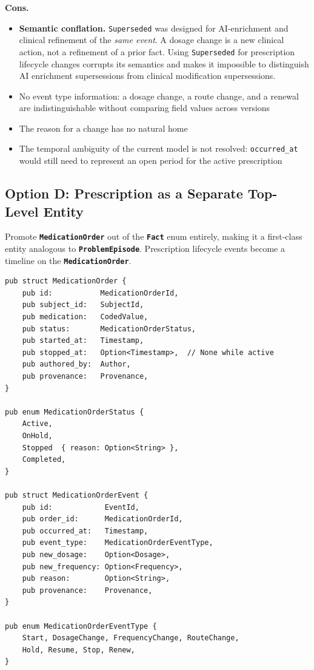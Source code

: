 \documentclass[11pt]{article}
\newcommand{\entity}[1]{\texttt{\textbf{#1}}}
\newcommand{\field}[1]{\texttt{#1}}
\newenvironment{consbox}{%
  \begin{mdframed}[backgroundcolor=warningyellow,
    linecolor=warningborder, linewidth=1pt,
    innertopmargin=8pt, innerbottommargin=8pt,
    innerleftmargin=10pt, innerrightmargin=10pt]
  \small
}{%
  \end{mdframed}
}
\begin{document}
\begin{consbox}
\textbf{Cons.}
\begin{itemize}[noitemsep]
  \item \textbf{Semantic conflation.} \field{Superseded} was designed
    for AI-enrichment and clinical refinement of the \emph{same event}.
    A dosage change is a new clinical action, not a refinement of
    a prior fact. Using \field{Superseded} for prescription lifecycle
    changes corrupts its semantics and makes it impossible to
    distinguish AI enrichment supersessions from clinical modification
    supersessions.
  \item No event type information: a dosage change, a route change,
    and a renewal are indistinguishable without comparing field values
    across versions
  \item The reason for a change has no natural home
  \item The temporal ambiguity of the current model is not resolved:
    \field{occurred\_at} would still need to represent an open period
    for the active prescription
\end{itemize}
\end{consbox}

\subsection{Option D: Prescription as a Separate Top-Level Entity}
\label{sec:option-d}

Promote \entity{MedicationOrder} out of the \entity{Fact} enum
entirely, making it a first-class entity analogous to
\entity{ProblemEpisode}. Prescription lifecycle events become a
timeline on the \entity{MedicationOrder}.

\begin{lstlisting}
pub struct MedicationOrder {
    pub id:           MedicationOrderId,
    pub subject_id:   SubjectId,
    pub medication:   CodedValue,
    pub status:       MedicationOrderStatus,
    pub started_at:   Timestamp,
    pub stopped_at:   Option<Timestamp>,  // None while active
    pub authored_by:  Author,
    pub provenance:   Provenance,
}

pub enum MedicationOrderStatus {
    Active,
    OnHold,
    Stopped  { reason: Option<String> },
    Completed,
}

pub struct MedicationOrderEvent {
    pub id:            EventId,
    pub order_id:      MedicationOrderId,
    pub occurred_at:   Timestamp,
    pub event_type:    MedicationOrderEventType,
    pub new_dosage:    Option<Dosage>,
    pub new_frequency: Option<Frequency>,
    pub reason:        Option<String>,
    pub provenance:    Provenance,
}

pub enum MedicationOrderEventType {
    Start, DosageChange, FrequencyChange, RouteChange,
    Hold, Resume, Stop, Renew,
}
\end{lstlisting}
\end{document}
